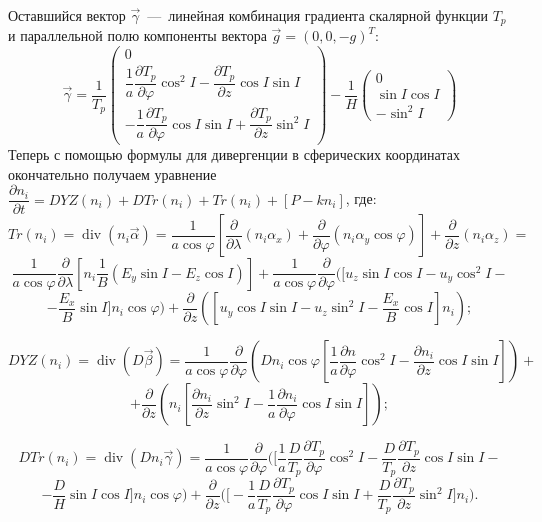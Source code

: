 \documentclass[14pt, a4paper, fleqn]{extarticle}
\renewcommand{\div}{\operatorname{div}}
\begin{document}
Оставшийся вектор $\vec{\gamma}$~---~линейная комбинация градиента скалярной функции $T_p$ и параллельной полю компоненты вектора $\vec{g} = (0, 0, -g)^T$: $$\vec{\gamma} = \dfrac{1}{T_p}\left(\begin{array}{crl}
0\\
\dfrac{1}{a}\dfrac{\partial T_p}{\partial \varphi}\cos^2 I - \dfrac{\partial T_p}{\partial z}\cos I\sin I\\
-\dfrac{1}{a}\dfrac{\partial T_p}{\partial \varphi}\cos I\sin I + \dfrac{\partial T_p}{\partial z}\sin^2 I
\end{array}\right) -\dfrac{1}{H} \left(\begin{array}{crl}
0\\
\sin I\cos I\\
-\sin^2 I
\end{array}\right)$$
Теперь с помощью формулы для дивергенции в сферических координатах окончательно получаем уравнение $\dfrac{\partial n_i}{\partial t} = DYZ(n_i)+DTr(n_i)+Tr(n_i)+[P-kn_i]$, где: $$Tr(n_i) = \div (n_i\vec{\alpha}) = \dfrac{1}{a\cos\varphi}\left[\dfrac{\partial}{\partial\lambda}(n_i\alpha_x) + \dfrac{\partial}{\partial\varphi}(n_i \alpha_y\cos\varphi) \right]+\dfrac{\partial}{\partial z}(n_i \alpha_z)=$$ $$\dfrac{1}{a\cos\varphi}\dfrac{\partial}{\partial\lambda}\left[n_i\dfrac{1}{B}(E_y\sin I - E_z\cos I)\right]+\dfrac{1}{a\cos\varphi}\dfrac{\partial}{\partial\varphi}\bigg(\bigg[u_z\sin I \cos I - u_y\cos^2 I -$$ $$- \dfrac{E_x}{B}\sin I\bigg]n_i\cos\varphi\bigg)+\dfrac{\partial}{\partial z}\left(\left[u_y\cos I \sin I -u_z\sin^2 I - \dfrac{E_x}{B}\cos I\right]n_i\right);$$

$$DYZ(n_i) = \div (D\vec{\beta}) = \dfrac{1}{a\cos\varphi}\dfrac{\partial}{\partial\varphi}\left(Dn_i\cos\varphi\left[\dfrac{1}{a}\dfrac{\partial n}{\partial\varphi} \cos^2 I -\dfrac{\partial n_i}{\partial z}\cos I\sin I\right]\right)+$$ $$ + \dfrac{\partial}{\partial z}\left(n_i\left[\dfrac{\partial n_i}{\partial z}\sin^2 I - \dfrac{1}{a}\dfrac{\partial n_i}{\partial\varphi}\cos I \sin I\right]\right);$$ 

$$DTr(n_i) = \div(Dn_i\vec{\gamma}) = \dfrac{1}{a\cos\varphi}\dfrac{\partial}{\partial \varphi}\bigg(\bigg[\dfrac{1}{a}\dfrac{D}{T_p}\dfrac{\partial T_p}{\partial\varphi}\cos^2 I-\dfrac{D}{T_p}\dfrac{\partial T_p}{\partial z}\cos I \sin I - $$ $$-\dfrac{D}{H}\sin I \cos I\bigg]n_i\cos\varphi\bigg) + \dfrac{\partial}{\partial z}\bigg(\bigg[-\dfrac{1}{a}\dfrac{D}{T_p}\dfrac{\partial T_p}{\partial \varphi}\cos I \sin I + \dfrac{D}{T_p}\dfrac{\partial T_p}{\partial z}\sin^2 I\bigg]n_i\bigg).$$
\end{document}
